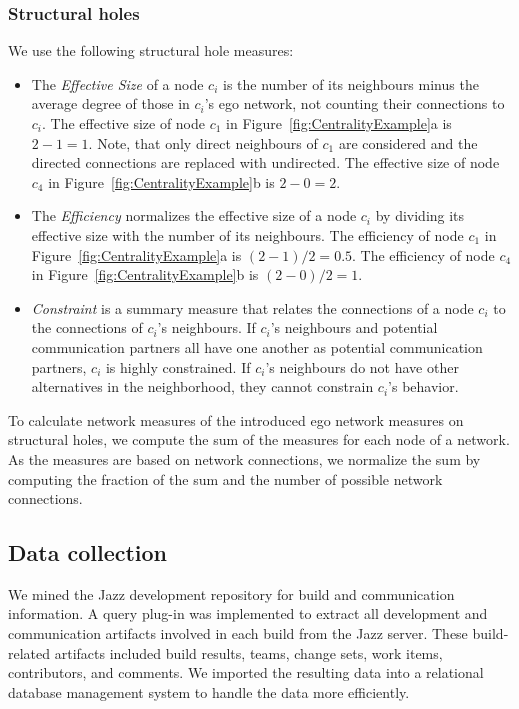 
\subsubsection{Structural holes}
We use the following structural hole measures:
\begin{itemize}
  \item The \emph{Effective Size} of a node $c_i$ is the number of its
  neighbours minus the average degree of those in $c_i$'s ego network, not
  counting their connections to $c_i$. The effective size of node $c_1$ in 
  Figure~\ref{fig:CentralityExample}a is $2-1=1$. Note, that only direct
  neighbours of $c_1$ are considered and the directed connections are replaced
  with undirected. The effective size of node $c_4$ in 
  Figure~\ref{fig:CentralityExample}b is $2-0=2$.
  
  \item The \emph{Efficiency} normalizes the effective size of a node $c_i$ by
  dividing its effective size with the number of its neighbours. The
  efficiency of node $c_1$ in Figure~\ref{fig:CentralityExample}a is
  $(2-1)/2=0.5$. The efficiency of node $c_4$ in
  Figure~\ref{fig:CentralityExample}b is $(2-0)/2=1$.
  
  \item \emph{Constraint} is a summary measure that relates the connections of a
  node $c_i$ to the connections of $c_i$'s neighbours. If $c_i$'s neighbours and
  potential communication partners all have one another as potential communication
  partners, $c_i$ is highly constrained. If $c_i$'s neighbours do not have other
  alternatives in the neighborhood, they cannot constrain $c_i$'s behavior. 
\end{itemize}

To calculate network measures of the introduced ego network measures on
structural holes, we compute the sum of the measures for each node of a network.
As the measures are based on network connections, we normalize the sum by
computing the fraction of the sum and the number of possible network connections.

\subsection{Data collection} 
We mined the Jazz development repository for build and communication information.
A query plug-in was implemented to extract all development and communication
artifacts involved in each build from the Jazz server. These build-related
artifacts included build results, teams, change sets, work items, contributors,
and comments. We imported the resulting data into a relational database
management system to handle the data more efficiently.

